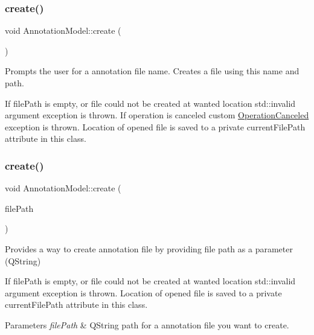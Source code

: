 \subsubsection{\texorpdfstring{create()}{create()}\hspace{0.1cm}{\footnotesize\ttfamily [1/2]}}
{\footnotesize\ttfamily void Annotation\+Model\+::create (\begin{DoxyParamCaption}{ }\end{DoxyParamCaption})}



Prompts the user for a annotation file name. Creates a file using this name and path. 

If file\+Path is empty, or file could not be created at wanted location std\+::invalid argument exception is thrown. If operation is canceled custom \hyperlink{classOperationCanceled}{Operation\+Canceled} exception is thrown. Location of opened file is saved to a private current\+File\+Path attribute in this class. \mbox{\label{classAnnotationModel_ac5062c8663670a312132929f16e4be64}} 
\subsubsection{\texorpdfstring{create()}{create()}\hspace{0.1cm}{\footnotesize\ttfamily [2/2]}}
{\footnotesize\ttfamily void Annotation\+Model\+::create (\begin{DoxyParamCaption}\item[{const Q\+String \&}]{file\+Path }\end{DoxyParamCaption})}



Provides a way to create annotation file by providing file path as a parameter (Q\+String) 

If file\+Path is empty, or file could not be created at wanted location std\+::invalid argument exception is thrown. Location of opened file is saved to a private current\+File\+Path attribute in this class.


\begin{DoxyParams}{Parameters}
{\em file\+Path} & Q\+String path for a annotation file you want to create. \\
\hline
\end{DoxyParams}
\mbox{\label{classAnnotationModel_a242d12f3043434463c061b4a38d27c90}} 
